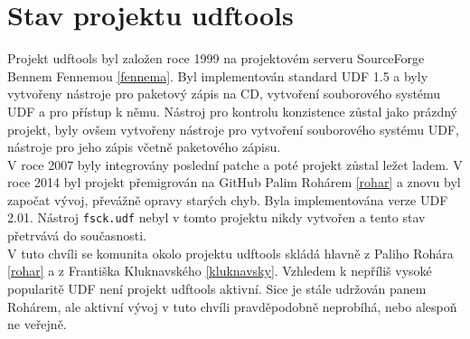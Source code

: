 \section{Stav projektu udftools}
Projekt udftools byl založen roce 1999 na projektovém serveru SourceForge \cite{udftools-sourceforge} Bennem Fennemou \ref{fennema}. Byl implementován standard UDF 1.5 a byly vytvořeny nástroje pro paketový zápis na CD, vytvoření souborového systému UDF a pro přístup k němu. Nástroj pro kontrolu konzistence zůstal jako prázdný projekt, byly ovšem vytvořeny nástroje pro vytvoření souborového systému UDF, nástroje pro jeho zápis včetně paketového zápisu.\\
V roce 2007 byly integrovány poslední patche a poté projekt zůstal ležet ladem. V roce 2014 byl projekt přemigrován na GitHub \cite{udftools-github} Palim Rohárem \ref{rohar} a znovu byl započat vývoj, převážně opravy starých chyb. Byla implementována verze UDF 2.01. Nástroj \texttt{fsck.udf} nebyl v tomto projektu nikdy vytvořen a tento stav přetrvává do současnosti.\\
V tuto chvíli se komunita okolo projektu udftools skládá hlavně z Paliho Rohára \ref{rohar} a z Františka Kluknavského \ref{kluknavsky}. Vzhledem k nepříliš vysoké popularitě UDF není projekt udftools aktivní. Sice je stále udržován panem Rohárem, ale aktivní vývoj v tuto chvíli pravděpodobně neprobíhá, nebo alespoň ne veřejně.

